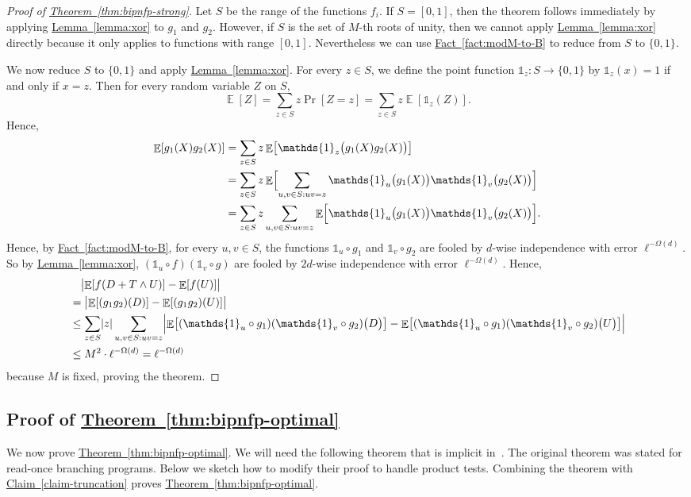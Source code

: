 \documentclass[11pt]{article}
\numberwithin{equation}{section}
\theoremstyle{definition}
\theoremstyle{plain}
\newcommand{\expref}[2]{\hyperref[#2]{#1~\ref{#2}}}
\newcommand{\zo}{\{0,1\}}
\def\Blocklength{\ell}
\def\1{\mathds{1}}
\DeclarePairedDelimiter{\abs}{\lvert}{\rvert}
\DeclareMathOperator*{\E}{\mathbb{E}}                 %
\begin{document}
\begin{proof}[Proof of {\expref{Theorem}{thm:bipnfp-strong}}]
    Let $S$ be the range of the functions $f_i$.
    If $S = [0, 1]$, then the theorem follows immediately by applying \expref{Lemma}{lemma:xor} to $g_1$ and $g_2$.
    However, if $S$ is the set of $M$-th roots of unity, then we cannot apply \expref{Lemma}{lemma:xor} directly because it only applies to functions with range $[0, 1]$.
    Nevertheless we can use \expref{Fact}{fact:modM-to-B} to reduce from $S$ to $\zo$.

    We now reduce $S$ to $\zo$ and apply \expref{Lemma}{lemma:xor}.
    For every $z \in S$, we define the point function $\1_z \colon S \to \zo$ by $\1_z(x) = 1$ if and only if $x = z$.
    Then for every random variable $Z$ on $S$,
    \[ \E[Z] = \sum_{z \in S} z \Pr[Z = z] = \sum_{z \in S} z \E[\1_z(Z)].\]
    Hence,
    \begin{align*}
      \E[g_1(X) g_2(X)]
      &= \sum_{z \in S} z \E \bigl[\1_z \bigl( g_1(X) g_2(X) \bigr) \bigr] \\
      &= \sum_{z \in S} z \E \Bigl[ \sum_{u,v \in S: uv = z} \1_u \bigl( g_1(X) \bigr) \1_v \bigl( g_2(X) \bigr) \Bigr] \\
      &= \sum_{z \in S} z \sum_{u,v \in S: uv = z} \E \Bigl[ \1_u \bigl( g_1(X) \bigr) \1_v \bigl( g_2(X) \bigr) \Bigr].
    \end{align*}
    Hence, by \expref{Fact}{fact:modM-to-B}, for every $u,v \in S$, the functions $\1_u \circ g_1$ and $\1_v \circ g_2$ are fooled by $d$-wise independence with error $\Blocklength^{-\Omega(d)}$.
    So by \expref{Lemma}{lemma:xor}, $(\1_u \circ f)(\1_v \circ g)$ are fooled by $2d$-wise independence with error $\Blocklength^{-\Omega(d)}$.
    Hence,
    \begin{align*}
      &\quad \bigl| \E[f(D + T \wedge U)] - \E[f(U)] \bigr| \\
      &= \bigl| \E[(g_1 g_2)(D)] - \E[(g_1 g_2)(U)] \bigr| \\
      &\le \sum_{z \in S} \abs{z} \sum_{u,v \in S: uv = z} \Bigl| \E \bigl[(\1_u \circ g_1)(\1_v \circ g_2) \bigl( D \bigr) \bigr] - \E \bigl[(\1_u \circ g_1)(\1_{v} \circ g_2) \bigl( U \bigr) \bigr] \Bigr| \\
      &\le M^2 \cdot \Blocklength^{-\Omega(d)} = \Blocklength^{-\Omega(d)}
    \end{align*}
    because $M$ is fixed, proving the theorem.
  \end{proof}

  
  \subsection{Proof of \expref{Theorem}{thm:bipnfp-optimal}}
	We now prove \expref{Theorem}{thm:bipnfp-optimal}.
	We will need the following theorem that is implicit in~\cite{ForbesK18}.
	The original theorem was stated for read-once branching programs.
	Below we sketch how to modify their proof to handle product tests.
	Combining the theorem with \expref{Claim}{claim-truncation} proves \expref{Theorem}{thm:bipnfp-optimal}.
\end{document}
